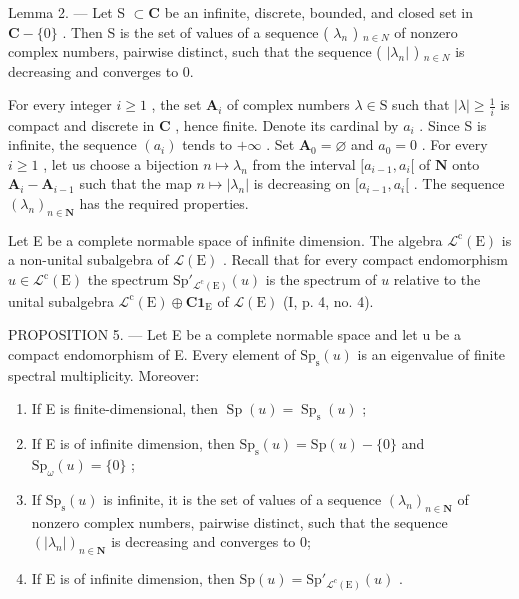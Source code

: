 Lemma 2. --- Let S \(\subset \mathbf{C}\) be an infinite, discrete, bounded, and closed set in \(\mathbf{C} - \{0\}\) . Then S is the set of values of a sequence ( \(\lambda_{n}\) ) \(_{n\in N}\) of nonzero complex numbers, pairwise distinct, such that the sequence ( \(|\lambda_{n}|\) ) \(_{n\in N}\) is decreasing and converges to 0.

For every integer \(i \geqslant 1\) , the set \(\mathbf{A}_i\) of complex numbers \(\lambda \in \mathrm{S}\) such that \(|\lambda| \geqslant \frac{1}{i}\) is compact and discrete in \(\mathbf{C}\) , hence finite. Denote its cardinal by \(a_i\) . Since S is infinite, the sequence \((a_i)\) tends to \(+\infty\) . Set \(\mathbf{A}_0 = \varnothing\) and \(a_0 = 0\) . For every \(i \geqslant 1\) , let us choose a bijection \(n \mapsto \lambda_n\) from the interval \([a_{i-1}, a_i[\) of \(\mathbf{N}\) onto \(\mathbf{A}_i - \mathbf{A}_{i-1}\) such that the map \(n \mapsto |\lambda_n|\) is decreasing on \([a_{i-1}, a_i[\) . The sequence \((\lambda_n)_{n \in \mathbf{N}}\) has the required properties.

Let E be a complete normable space of infinite dimension. The algebra \(\mathcal{L}^{\mathrm{c}}(\mathrm{E})\) is a non-unital subalgebra of \(\mathcal{L}(\mathrm{E})\) . Recall that for every compact endomorphism \(u \in \mathcal{L}^{\mathrm{c}}(\mathrm{E})\) the spectrum \(\mathrm{Sp}'_{\mathcal{L}^{\mathrm{c}}(\mathrm{E})}(u)\) is the spectrum of \(u\) relative to the unital subalgebra \(\mathcal{L}^{\mathrm{c}}(\mathrm{E}) \oplus \mathbf{C1}_{\mathrm{E}}\) of \(\mathcal{L}(\mathrm{E})\) (I, p. 4, no. 4).

PROPOSITION 5. — Let E be a complete normable space and let u be a compact endomorphism of E. Every element of \(\mathrm{Sp}_{\mathrm{s}}(u)\) is an eigenvalue of finite spectral multiplicity. Moreover:

\begin{enumerate}
\def\labelenumi{\alph{enumi})}
\item
  If E is finite-dimensional, then \(\operatorname{Sp}(u) = \operatorname{Sp}_{\mathrm{s}}(u)\) ;
\item
  If E is of infinite dimension, then \(\mathrm{Sp}_{\mathrm{s}}(u) = \mathrm{Sp}(u) - \{0\}\) and \(\mathrm{Sp}_{\omega}(u) = \{0\}\) ;
\item
  If \(\mathrm{Sp}_{\mathrm{s}}(u)\) is infinite, it is the set of values of a sequence \((\lambda_{n})_{n\in\mathbf{N}}\) of nonzero complex numbers, pairwise distinct, such that the sequence \((|\lambda_{n}|)_{n\in\mathbf{N}}\) is decreasing and converges to 0;
\item
  If E is of infinite dimension, then \(\mathrm{Sp}(u) = \mathrm{Sp}'_{\mathcal{L}^c (\mathrm{E})}(u)\) .
\end{enumerate}

